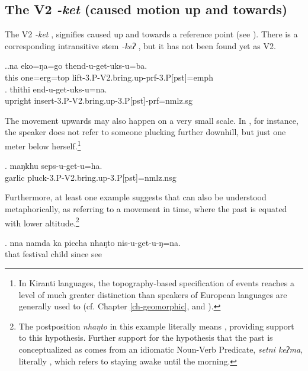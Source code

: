 \subsection{The V2 \emph{-ket} (caused motion up and towards)}\label{V2-bringup}%

The V2 \emph{-ket}  , signifies caused  up and towards a reference point (see \Next). There is a corresponding intransitive stem \emph{-keʔ} , but it has not been found yet as V2.  

\ex.\ag.na   eko=ŋa=go  thend-u-get-uks-u=ba.\\
this one{\sc =erg=top} lift{\sc -3.P-V2.bring.up-prf-3.P[pst]=emph}\\
 
\bg. thithi end-u-get-uks-u=na.\\
upright insert{\sc -3.P-V2.bring.up-3.P[pst]-prf=nmlz.sg}\\

\newpage
The movement upwards may also happen on a very small scale. In \Next, for instance, the speaker does not refer to someone plucking further downhill, but just one meter below herself.\footnote{In Kiranti languages, the topography-based specification of events reaches a level of much greater distinction than speakers of European languages  are generally used to (cf. Chapter \ref{ch-geomorphic}, and  \citealt{Bickel1999Cultural, Bickel2001Deictic, Ebert1999The-up---down, Gaenszle1999Travelling}).}

\exg. maŋkhu seps-u-get-u=ha.\\
garlic pluck{\sc -3.P-V2.bring.up-3.P[pst]=nmlz.nsg}\\

Furthermore, at least one example suggests that  can also be understood metaphorically, as referring to a movement in time, where the past is equated with lower altitude.\footnote{The postposition \emph{nhaŋto}  in this example literally means , providing  support to this hypothesis. Further support for the hypothesis that the past is conceptualized as  comes from an idiomatic Noun-Verb Predicate, \emph{setni keʔma}, literally , which refers to staying awake until the morning.}

\exg. nna  namda ka       piccha nhaŋto nis-u-get-u-ŋ=na.\\
that festival  child since see\\
  


